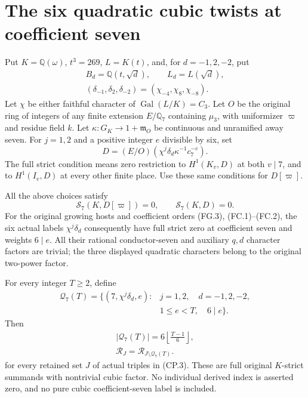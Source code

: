 \section{The six quadratic cubic twists at coefficient seven}
\label{sec:mixed-cubic-quadratic-coefficient-seven}

Put $K=\mathbb Q(\omega)$, $t^3=269$, $L=K(t)$, and, for
$d=-1,2,-2$, put
\[
 \begin{gathered}
 B_d=\mathbb Q(t,\sqrt d),\qquad L_d=L(\sqrt d),\\
 (\delta_{-1},\delta_2,\delta_{-2})=(\chi_{-4},\chi_8,\chi_{-8}).
 \end{gathered}
 \tag{MQ7.1}
\]
Let $\chi$ be either faithful character of
$\operatorname{Gal}(L/K)=C_3$.
Let $O$ be the original ring of integers of any finite extension
$E/\mathbb Q_7$ containing $\mu_3$, with uniformizer $\varpi$
and residue field $k$.  Let $\kappa:G_K\to1+\mathfrak m_O$
be continuous and unramified away seven.
For $j=1,2$ and a positive integer $e$ divisible by six, set
\[
               D=(E/O)(\chi^j\delta_d\kappa^{-1}c_7^{-e}).
 \tag{MQ7.2}
\]
The full strict condition means zero restriction to
$H^1(K_v,D)$ at both $v\mid7$, and to $H^1(I_v,D)$
at every other finite place.  Use these same conditions for
$D[\varpi]$.

\begin{theorem}
\label{AC-G211}
All the above choices satisfy
\[
                 \mathcal S_7(K,D[\varpi])=0,
                 \qquad\mathcal S_7(K,D)=0.
 \tag{MQ7.3}
\]
For the original growing hosts and coefficient orders
(FG.3), (FC.1)--(FC.2), the six actual labels
$\chi^j\delta_d$ consequently have full strict zero at
coefficient seven and weights $6\mid e$.  All their rational
conductor-seven and auxiliary $q,d$ character factors are
trivial; the three displayed quadratic characters belong to
the original two-power factor.

For every integer $T\geq2$, define
\[
 \begin{split}
 \mathcal Q_7(T)=\{(7,\chi^j\delta_d,e):{}&j=1,2,\quad d=-1,2,-2,\\
                         &1\leq e<T,\quad 6\mid e\}.
 \end{split}
 \tag{MQ7.4}
\]
Then
\[
 \begin{gathered}
 |\mathcal Q_7(T)|=6\left\lfloor\frac{T-1}{6}\right\rfloor,\\
 \mathcal R_J=\mathcal R_{J\setminus\mathcal Q_7(T)}.
 \end{gathered}
 \tag{MQ7.5}
\]
for every retained set $J$ of actual triples in (CP.3).
These are full original $K$-strict summands with nontrivial
cubic factor.  No individual derived index is asserted zero,
and no pure cubic coefficient-seven label is included.
\end{theorem}

